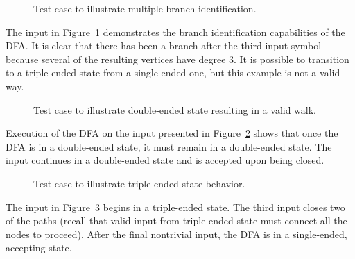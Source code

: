 \begin{figure}[h!]
\begin{center}
\end{center}
\caption{Test case to illustrate multiple branch identification.}
\label{fig:mult-branch} 
\end{figure}
The input in Figure~\ref{fig:mult-branch} demonstrates the branch identification capabilities of the DFA. It is clear that there has been a branch after the third input symbol because several of the resulting vertices have degree 3. It is possible to transition to a triple-ended state from a single-ended one, but this example is not a valid way.

\begin{figure}[h!]
\begin{center}
\end{center}
\caption{Test case to illustrate double-ended state resulting in a valid walk.}
\label{fig:double-ended}
\end{figure}
Execution of the DFA on the input presented in Figure~\ref{fig:double-ended} shows that once the DFA is in a double-ended state, it must remain in a double-ended state. The input continues in a double-ended state and is accepted upon being closed.

\begin{figure}[h!]
\begin{center}
\end{center}
\caption{Test case to illustrate triple-ended state behavior.}
\label{fig:triple-ended}
\end{figure}
The input in Figure~\ref{fig:triple-ended} begins in a triple-ended state. The third input closes two of the paths (recall that valid input from triple-ended state must connect all the nodes to proceed). After the final nontrivial input, the DFA is in a single-ended, accepting state.
